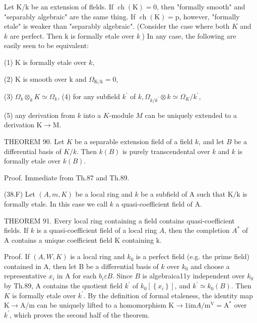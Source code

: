 Let $\mathrm{K} / \mathrm{k}$ be an extension of flelds. If $\operatorname{ch}(\mathrm{K})=0$, then "formally smooth" and "separably algebraic" are the same thing. If $\operatorname{ch}(\mathrm{K})=\mathrm{p}$, however, "formally etale" is weaker than "separably algebraic". (Consider the case where both $K$ and $k$ are perfect. Then $\mathrm{k}$ is formally etale over $k_{.}$) In any case, the following are easily seen to be equivalent:

(1) $\mathrm{K}$ is formally etale over $k$,

(2) $\mathrm{K}$ is smooth over $\mathrm{k}$ and $\Omega_{\mathrm{K} / \mathrm{k}}=0$,

(3) $\Omega_{k} \otimes_{k} K \simeq \Omega_{k}$, (4) for any subfield $k^{\prime}$ of $k, \Omega_{k / k^{\prime}} \otimes k \simeq \Omega_{K} / k^{\prime}$,

(5) any derivation from $k$ into a $K$-module $M$ can be uniquely extended to a derivation $\mathrm{K} \rightarrow \mathrm{M}$.

THEOREM 90. Let $K$ be a separable extension field of a field $k$, and let $B$ be a differential basis of $K / k$. Then $k(B)$ is purely transcendental over $k$ and $k$ is formally etale over $k(B)$.

Proof. Immediate from Th.87 and Th.89.

(38.F) Let $(A, m, K)$ be a local ring and $k$ be a subfield of A such that $\mathrm{K} / \mathrm{k}$ is formally etale. In this case we call $k$ a quasi-coefficient field of A.

THEOREM 91. Every local ring containing a field contains quasi-coefficient fields. If $k$ is a quasi-coefficient field of a local ring $A$, then the completion $A^{*}$ of A contains a unique coefficient field $\mathrm{K}$ containing $\mathrm{k}$.

Proof. If $(A, W, K)$ is a local ring and $k_{0}$ is a perfect field (e.g. the prime field) contained in A, then let B be a differential basis of $k$ over $k_{0}$ and choose a representative $x_{i}$ in A for each $b_{i} \varepsilon B$. Since $B$ is algebraica11y independent over $k_{0}$ by Th.89, A contains the quotient field $k^{\prime}$ of $k_{0}\left[\left\{x_{i}\right\}\right]$, and $k^{\prime} \simeq k_{0}(B)$. Then $K$ is formally etale over $k^{\prime}$. By the definition of formal etaleness, the identity map $\mathrm{K} \rightarrow \mathrm{A} / \mathrm{m}$ can be uniquely lifted to a homomorphism $\mathrm{K} \rightarrow 1 \mathrm{im} A / \mathrm{m}^{\mathrm{V}}=\mathrm{A}^{*}$ over $k^{\prime}$, which proves the second half of the theorem.

